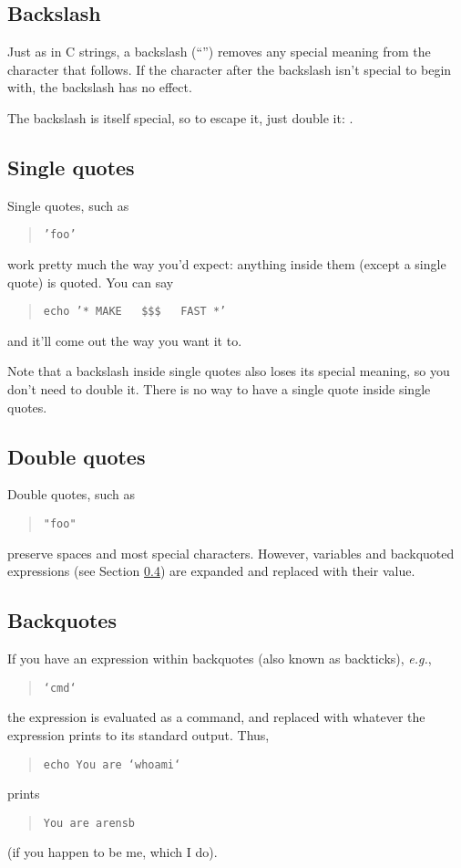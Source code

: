 \documentclass{article}
\newcommand{\code}[1]{\texttt{#1}}
\newcommand{\bs}{\symbol{"5C}}
\begin{document}
\subsection{Backslash}

	Just as in C strings, a backslash (``\code{\bs}'')
removes any special meaning from the character that follows. If the
character after the backslash isn't special to begin with, the
backslash has no effect.

	The backslash is itself special, so to escape it, just double
it: \code{\bs\bs}.

\subsection{Single quotes}

	Single quotes, such as
\begin{quote}
\code{'foo'}
\end{quote}
work pretty much the way you'd expect: anything inside them (except
a single quote) is quoted. You can say
\begin{quote}
\code{echo '* MAKE\ \ \ \$\$\$\ \ \ FAST *'}
\end{quote}
and it'll come out the way you want it to.

	Note that a backslash inside single quotes also loses its
special meaning, so you don't need to double it. There is no way to
have a single quote inside single quotes.

\subsection{Double quotes}
\label{double-quotes}
	Double quotes, such as
\begin{quote}
\code{"foo"}
\end{quote}
preserve spaces and most special characters. However, variables and
backquoted expressions (see Section \ref{backquote}) are expanded and
replaced with their value.

\subsection{Backquotes}
\label{backquote}
	If you have an expression within backquotes (also known as
backticks), \textit{e.g.},
\begin{quote}
\code{`cmd`}
\end{quote}
the expression is evaluated as a command, and replaced with whatever
the expression prints to its standard output. Thus,
\begin{quote}
\code{echo You are `whoami`}
\end{quote}
prints
\begin{quote}
\code{You are arensb}
\end{quote}
(if you happen to be me, which I do).
\end{document}
